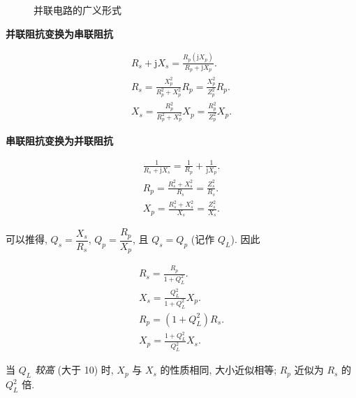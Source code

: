 \begin{figure}[H]
\begin{minipage}{.45\textwidth}
        \centering
        \caption{并联电路的广义形式}
    \end{minipage}
\end{figure}

\textbf{并联阻抗变换为串联阻抗}

\rmg
\begin{gather}
    \nonumber R_s+\mathrm{j}X_s=\frac{R_p(\mathrm{j}X_p)}{R_p+\mathrm{j}X_p}. \\
    R_s=\frac{X_p^2}{R_p^2+X_p^2}R_p=\frac{X_p^2}{Z_p^2}R_p. \\
    X_s=\frac{R_p^2}{R_p^2+X_p^2}X_p=\frac{R_p^2}{Z_p^2}X_p.
\end{gather}

\textbf{串联阻抗变换为并联阻抗}

\rmg
\begin{gather}
    \nonumber \frac{1}{R_s+\mathrm{j}X_s}=\frac{1}{R_p}+\frac{1}{\mathrm{j}X_p}. \\
    R_p=\frac{R_s^2+X_s^2}{R_s}=\frac{Z_s^2}{R_s}. \\
    X_p=\frac{R_s^2+X_s^2}{X_s}=\frac{Z_s^2}{X_s}.
\end{gather}

可以推得, $Q_s=\dfrac{X_s}{R_s}$, $Q_p=\dfrac{R_p}{X_p}$, 且 $Q_s=Q_p$ (记作 $Q_L$). 因此

\rmg
\begin{gather}
    R_s=\frac{R_p}{1+Q_L^2}. \\
    X_s=\frac{Q_L^2}{1+Q_L^2}X_p. \\
    R_p=(1+Q_L^2)R_s. \\
    X_p=\frac{1+Q_L^2}{Q_L^2}X_s.
\end{gather}

当 $Q_L$ \textit{较高} (大于 10) 时, $X_p$ 与 $X_s$ 的性质相同, 大小近似相等; $R_p$ 近似为 $R_s$ 的 $Q_L^2$ 倍.

